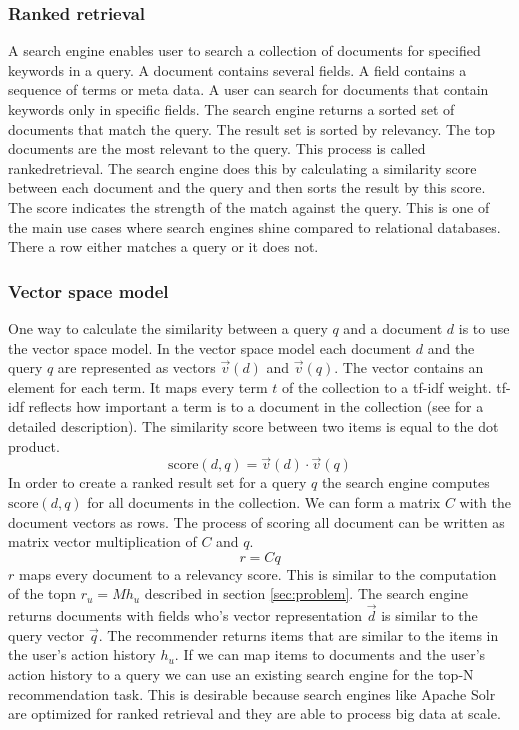 
\subsubsection{Ranked retrieval}
A search engine enables user to search a collection of documents for specified keywords in a query. A document contains several fields. A field contains a sequence of terms or meta data. A user can search for documents that contain keywords only in specific fields. The search engine returns a sorted set of documents that match the query. The result set is sorted by relevancy. The top documents are the most relevant to the query. This process is called \gls{rankedretrieval}. The search engine does this by calculating a similarity score between each document and the query and then sorts the result by this score. The score indicates the strength of the match against the query. This is one of the main use cases where search engines shine compared to relational databases. There a row either matches a query or it does not. 

\subsubsection{Vector space model}
One way to calculate the similarity between a query $q$ and a document $d$ is to use the vector space model.
In the vector space model each document $d$ and the query $q$ are represented as vectors $\vec{v}(d)$ and $\vec{v}(q)$. The vector contains an element for each term. It maps every term $t$ of the collection to a tf-idf weight. tf-idf reflects how important a term is to a document in the collection (see \cite{Manning} for a detailed description). 
The similarity score between two items is equal to the dot product.
\begin{equation}
  \label{eq:score}
  \text{score}(d,q) = \vec{v}(d) \cdot \vec{v}(q)
\end{equation}
In order to create a ranked result set for a query $q$ the search engine computes $\text{score}(d,q)$ for all documents in the collection. We can form a matrix $C$ with the document vectors as rows. The process of scoring all document can be written as matrix vector multiplication of $C$ and $q$. 
\begin{equation}
  \label{eq:ser}
  r = C q
\end{equation}
$r$ maps every document to a relevancy score.
This is similar to the computation of the \gls{topn} $r_u = M h_u$  described in section \ref{sec:problem}. The search engine returns documents with fields who's vector representation $\vec{d}$ is similar to the query vector $\vec{q}$. The recommender returns items that are similar to the items in the user's action history $h_u$. If we can map items to documents and the user's action history to a query we can use an existing search engine for the top-N recommendation task. This is desirable because search engines like Apache Solr are optimized for ranked retrieval and they are able to process big data at scale. 

